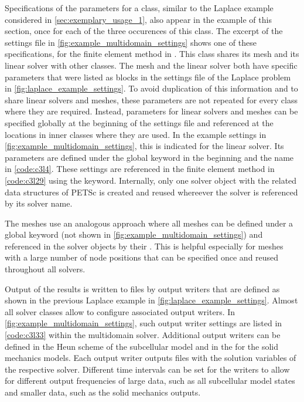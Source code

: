 Specifications of the parameters for a  class, similar to the Laplace example considered in \cref{sec:exemplary_usage_1}, also appear in the example of this section, once for each of the three occurences of this class. The excerpt of the settings file in \cref{fig:example_multidomain_settings} shows one of these specifications, for the  finite element method in . 
This  class shares its mesh and its linear solver with other classes. The mesh and the linear solver both have specific parameters that were listed as blocks in the settings file of the Laplace problem in \cref{fig:laplace_example_settings}. To avoid duplication of this information and to share linear solvers and meshes, these parameters are not repeated for every class where they are required. Instead, parameters for linear solvers and meshes can be specified globally at the beginning of the settings file and referenced at the locations in inner classes where they are used. In the example settings in \cref{fig:example_multidomain_settings}, this is indicated for the linear solver. Its parameters are defined under the global  keyword  in the beginning and the name  in \cref{code:c3l4}. These settings are referenced in the finite element method in \cref{code:c3l29} using the  keyword. Internally, only one solver object with the related data structures of PETSc is created and reused whereever the solver is referenced by its solver name.

The meshes use an analogous approach where all meshes can be defined under a global  keyword (not shown in \cref{fig:example_multidomain_settings}) and referenced in the solver objects by their . This is helpful especially for meshes with a large number of node positions that can be specified once and reused throughout all solvers.

Output of the results is written to files by output writers that are defined as shown in the previous Laplace example in \cref{fig:laplace_example_settings}. Almost all solver classes allow to configure associated output writers. In \cref{fig:example_multidomain_settings}, such output writer settings are listed in \cref{code:c3l33} within the multidomain solver. Additional output writers can be defined in the Heun scheme of the subcellular model and in the  for the solid mechanics models. Each output writer outputs files with the solution variables of the respective solver. Different time intervals can be set for the writers to allow for different output frequencies of large data, such as all subcellular model states and smaller data, such as the solid mechanics outputs.

